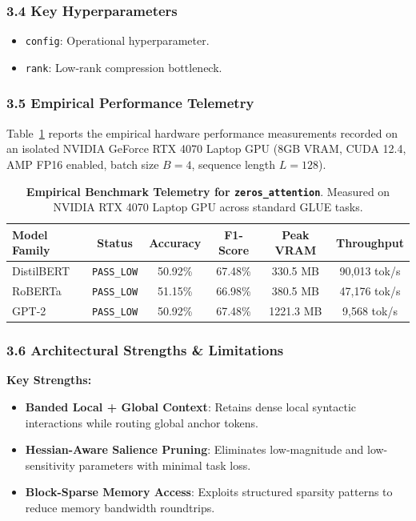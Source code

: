 \subsubsection*{3.4 Key Hyperparameters}
\begin{itemize}
    \item \texttt{config}: Operational hyperparameter.
    \item \texttt{rank}: Low-rank compression bottleneck.
\end{itemize}

\subsubsection*{3.5 Empirical Performance Telemetry}
Table~\ref{tab:telemetry_zeros_attention} reports the empirical hardware performance measurements recorded on an isolated NVIDIA GeForce RTX 4070 Laptop GPU (8GB VRAM, CUDA 12.4, AMP FP16 enabled, batch size $B=4$, sequence length $L=128$).

\begin{table}[h]
\centering
\small
\caption{\textbf{Empirical Benchmark Telemetry for \texttt{zeros\_attention}}. Measured on NVIDIA RTX 4070 Laptop GPU across standard GLUE tasks.}
\label{tab:telemetry_zeros_attention}
\begin{tabular*}{\columnwidth}{@{\extracolsep{\fill}}lccccc}
\toprule
\textbf{Model Family} & \textbf{Status} & \textbf{Accuracy} & \textbf{F1-Score} & \textbf{Peak VRAM} & \textbf{Throughput} \\
\midrule
DistilBERT & \texttt{PASS\_LOW} & 50.92\% & 67.48\% & 330.5 MB & 90,013 tok/s \\
RoBERTa & \texttt{PASS\_LOW} & 51.15\% & 66.98\% & 380.5 MB & 47,176 tok/s \\
GPT-2 & \texttt{PASS\_LOW} & 50.92\% & 67.48\% & 1221.3 MB & 9,568 tok/s \\
\bottomrule
\end{tabular*}
\end{table}

\subsubsection*{3.6 Architectural Strengths \& Limitations}
\textbf{Key Strengths:}
\begin{itemize}
    \item \textbf{Banded Local + Global Context}: Retains dense local syntactic interactions while routing global anchor tokens.
    \item \textbf{Hessian-Aware Salience Pruning}: Eliminates low-magnitude and low-sensitivity parameters with minimal task loss.
    \item \textbf{Block-Sparse Memory Access}: Exploits structured sparsity patterns to reduce memory bandwidth roundtrips.
\end{itemize}

